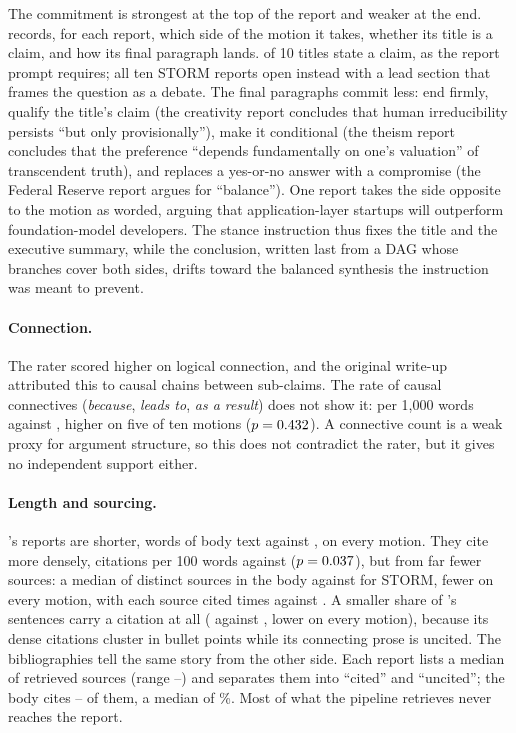 The commitment is strongest at the top of the report and weaker at the end.  records, for each \sys{} report, which side of the motion it takes, whether its title is a claim, and how its final paragraph lands. \labTitleClaim{} of 10 titles state a claim, as the report prompt requires; all ten STORM reports open instead with a lead section that frames the question as a debate. The final paragraphs commit less: \labEndingFirm{} end firmly, \labEndingQualified{} qualify the title's claim (the creativity report concludes that human irreducibility persists ``but only provisionally''), \labEndingConditional{} make it conditional (the theism report concludes that the preference ``depends fundamentally on one's valuation'' of transcendent truth), and \labEndingCompromise{} replaces a yes-or-no answer with a compromise (the Federal Reserve report argues for ``balance''). One report takes the side opposite to the motion as worded, arguing that application-layer startups will outperform foundation-model developers. The stance instruction thus fixes the title and the executive summary, while the conclusion, written last from a DAG whose branches cover both sides, drifts toward the balanced synthesis the instruction was meant to prevent.

\paragraph{Connection.}
The rater scored \sys{} higher on logical connection, and the original write-up attributed this to causal chains between sub-claims. The rate of causal connectives (\emph{because}, \emph{leads to}, \emph{as a result}) does not show it: \txCausalDc{} per 1{,}000 words against \txCausalSt{}, higher on five of ten motions ($p = 0.432$). A connective count is a weak proxy for argument structure, so this does not contradict the rater, but it gives no independent support either.

\paragraph{Length and sourcing.}
\sys{}'s reports are shorter, \txWordsDc{} words of body text against \txWordsSt{}, on every motion. They cite more densely, \txCiteDensityDc{} citations per 100 words against \txCiteDensitySt{} ($p = 0.037$), but from far fewer sources: a median of \txSourcesDc{} distinct sources in the body against \txSourcesSt{} for STORM, fewer on every motion, with each source cited \txCitesPerSourceDc{} times against \txCitesPerSourceSt{}. A smaller share of \sys{}'s sentences carry a citation at all (\txCitedShareDc{} against \txCitedShareSt{}, lower on every motion), because its dense citations cluster in bullet points while its connecting prose is uncited. The bibliographies tell the same story from the other side. Each \sys{} report lists a median of \bibMedDc{} retrieved sources (range \bibMinDc--\bibMaxDc) and separates them into ``cited'' and ``uncited''; the body cites \atUsedMin--\atUsedMax{} of them, a median of \atUsedShare\%. Most of what the pipeline retrieves never reaches the report.

